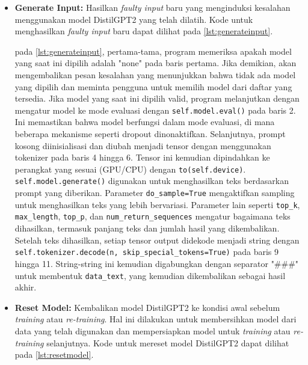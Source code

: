 \begin{enumerate}[topsep=0pt]
\begin{itemize}
      \item \textbf{Generate Input:} Hasilkan \emph{faulty input} baru yang menginduksi kesalahan menggunakan model DistilGPT2 yang telah dilatih.
      Kode untuk menghasilkan \emph{faulty input} baru dapat dilihat pada \ref{lst:generateinput}.

      

      pada \ref{lst:generateinput}, pertama-tama, program memeriksa apakah model yang saat ini dipilih adalah "none" pada baris pertama. Jika demikian, akan mengembalikan pesan kesalahan yang menunjukkan bahwa tidak ada model yang dipilih dan meminta pengguna untuk memilih model dari daftar yang tersedia.
      Jika model yang saat ini dipilih valid, program melanjutkan dengan mengatur model ke mode evaluasi dengan \texttt{self.model.eval()} pada baris 2. Ini memastikan bahwa model berfungsi dalam mode evaluasi, di mana beberapa mekanisme seperti dropout dinonaktifkan.
      Selanjutnya, prompt kosong diinisialisasi dan diubah menjadi tensor dengan menggunakan tokenizer pada baris 4 hingga 6. Tensor ini kemudian dipindahkan ke perangkat yang sesuai (GPU/CPU) dengan \texttt{to(self.device)}.
      \\

      \texttt{self.model.generate()} digunakan untuk menghasilkan teks berdasarkan prompt yang diberikan. Parameter \texttt{do\_sample=True} mengaktifkan sampling untuk menghasilkan teks yang lebih bervariasi. Parameter lain seperti \texttt{top\_k}, \texttt{max\_length}, \texttt{top\_p}, dan \texttt{num\_return\_sequences} mengatur bagaimana teks dihasilkan, termasuk panjang teks dan jumlah hasil yang dikembalikan.
      Setelah teks dihasilkan, setiap tensor output didekode menjadi string dengan \texttt{self.tokenizer.decode(n, skip\_special\_tokens=True)} pada baris 9 hingga 11. String-string ini kemudian digabungkan dengan separator "\#\#\#" untuk membentuk \texttt{data\_text}, yang kemudian dikembalikan sebagai hasil akhir.



      \item \textbf{Reset Model:} Kembalikan model DistilGPT2 ke kondisi awal sebelum \emph{training} atau \emph{re-training}.
      Hal ini dilakukan untuk membersihkan model dari data yang telah digunakan dan mempersiapkan model untuk \emph{training} atau \emph{re-training} selanjutnya.
      Kode untuk mereset model DistilGPT2 dapat dilihat pada \ref{lst:resetmodel}.


\end{itemize}
\end{enumerate}
